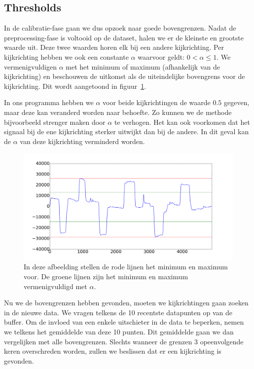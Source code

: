 \documentclass{article}
\begin{document}
\subsection{Thresholds}

In de calibratie-fase gaan we dus opzoek naar goede bovengrenzen. Nadat de preprocessing-fase is voltooid op de dataset, halen we er de kleinste en grootste waarde uit. Deze twee waarden horen elk bij een andere kijkrichting. Per kijkrichting hebben we ook een constante $\alpha$ waarvoor geldt: $0 < \alpha \leq 1$. We vermenigvuldigen $\alpha$ met het minimum of maximum (afhankelijk van de kijkrichting) en beschouwen de uitkomst als de uiteindelijke bovengrens voor de kijkrichting. Dit wordt aangetoond in figuur~\ref{fig:maxminthresholds}.

In ons programma hebben we $\alpha$ voor beide kijkrichtingen de waarde $0.5$ gegeven, maar deze kan veranderd worden naar behoefte. Zo kunnen we de methode bijvoorbeeld strenger maken door $\alpha$ te verhogen. Het kan ook voorkomen dat het signaal bij de ene kijkrichting sterker uitwijkt dan bij de andere. In dit geval kan de $\alpha$ van deze kijkrichting verminderd worden.

\begin{figure}[h]
\centering
\includegraphics[width=\linewidth]{images/thresholds_distribution}
\caption{In deze afbeelding stellen de rode lijnen het minimum en maximum voor. De groene lijnen zijn het minimum en maximum vermenigvuldigd met $\alpha$.}
\label{fig:maxminthresholds}
\end{figure}

Nu we de bovengrenzen hebben gevonden, moeten we kijkrichtingen gaan zoeken in de nieuwe data. We vragen telkens de 10 recentste datapunten op van de buffer. Om de invloed van een enkele uitschieter in de data te beperken, nemen we telkens het gemiddelde van deze 10 punten. Dit gemiddelde gaan we dan vergelijken met alle bovengrenzen. Slechts wanneer de grenzen 3 opeenvolgende keren overschreden worden, zullen we beslissen dat er een kijkrichting is gevonden.
\end{document}
